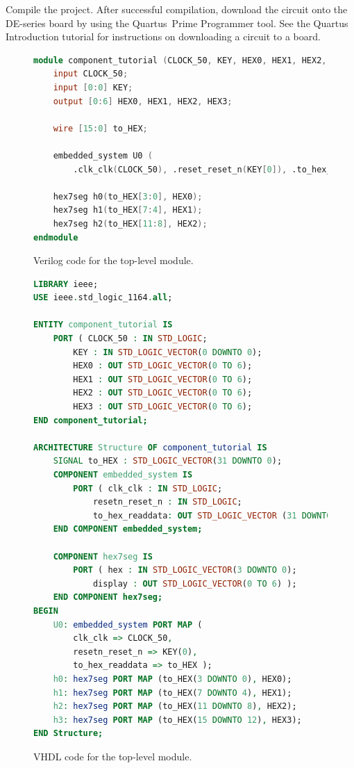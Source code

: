 \documentclass[11pt, twoside, pdftex]{article}
\begin{document}
Compile the project. After successful compilation, download the circuit onto the
DE-series board by using the Quartus~Prime Programmer tool. See the {\sf Quartus Introduction} tutorial
for instructions on downloading a circuit to a board.

\begin{figure}[!h]
	\begin{lstlisting}[language=Verilog]
module component_tutorial (CLOCK_50, KEY, HEX0, HEX1, HEX2, HEX3);
    input CLOCK_50;
    input [0:0] KEY;
    output [0:6] HEX0, HEX1, HEX2, HEX3;

    wire [15:0] to_HEX;

    embedded_system U0 (
        .clk_clk(CLOCK_50), .reset_reset_n(KEY[0]), .to_hex_readdata(to_HEX) );

    hex7seg h0(to_HEX[3:0], HEX0);
    hex7seg h1(to_HEX[7:4], HEX1);
    hex7seg h2(to_HEX[11:8], HEX2);
endmodule	
\end{lstlisting}
	\caption{Verilog code for the top-level module.}
	\label{fig:29}
\end{figure}

\clearpage
\newpage

\begin{figure}[!h]
	\begin{lstlisting}[language=VHDL]
LIBRARY ieee;
USE ieee.std_logic_1164.all;

ENTITY component_tutorial IS
    PORT ( CLOCK_50 : IN STD_LOGIC;
        KEY : IN STD_LOGIC_VECTOR(0 DOWNTO 0);
        HEX0 : OUT STD_LOGIC_VECTOR(0 TO 6);
        HEX1 : OUT STD_LOGIC_VECTOR(0 TO 6);
        HEX2 : OUT STD_LOGIC_VECTOR(0 TO 6);
        HEX3 : OUT STD_LOGIC_VECTOR(0 TO 6);
END component_tutorial;

ARCHITECTURE Structure OF component_tutorial IS
    SIGNAL to_HEX : STD_LOGIC_VECTOR(31 DOWNTO 0);
    COMPONENT embedded_system IS
        PORT ( clk_clk : IN STD_LOGIC;
            resetn_reset_n : IN STD_LOGIC;
            to_hex_readdata: OUT STD_LOGIC_VECTOR (31 DOWNTO 0) );
    END COMPONENT embedded_system;

    COMPONENT hex7seg IS
        PORT ( hex : IN STD_LOGIC_VECTOR(3 DOWNTO 0);
            display : OUT STD_LOGIC_VECTOR(0 TO 6) );
    END COMPONENT hex7seg;
BEGIN
    U0: embedded_system PORT MAP (
        clk_clk => CLOCK_50,
        resetn_reset_n => KEY(0),
        to_hex_readdata => to_HEX );
    h0: hex7seg PORT MAP (to_HEX(3 DOWNTO 0), HEX0);
    h1: hex7seg PORT MAP (to_HEX(7 DOWNTO 4), HEX1);
    h2: hex7seg PORT MAP (to_HEX(11 DOWNTO 8), HEX2);
    h3: hex7seg PORT MAP (to_HEX(15 DOWNTO 12), HEX3);
END Structure;	
\end{lstlisting}
	\caption{VHDL code for the top-level module.}
	\label{fig:30}
\end{figure}
\end{document}
